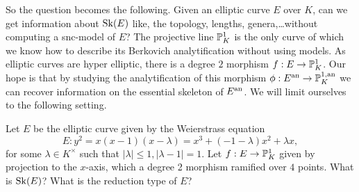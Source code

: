 So the question becomes the following. Given an elliptic curve $E$ over $K$, can we get information about $\operatorname{Sk}(E)$ like, the topology, lengths, genera,\ldots without computing a snc-model of  $E$?
The projective line $\mathbb{P}^{1}_K$ is the only curve of which we know how to describe its Berkovich analytification without using models. 
As elliptic curves are hyper elliptic, there is a degree $2$ morphism $f: E \to \mathbb{P}^{1}_K$. 
Our hope is that by studying the analytification of this morphism $\phi: E\an \to \pro^{1, \text{an}}_K$ we can recover information on the essential skeleton of $E{}^{\text{an}}$. 
We will limit ourselves to the following setting.
\begin{problem}\label{prob:main_problem}
	Let $E$ be the elliptic curve given by the Weierstrass equation 
	\begin{equation}\label{eq:weierstrass_problem}
		E: y^2 = x(x-1)(x-\lambda) = x^3 + (-1 - \lambda) x^2 + \lambda x
	,\end{equation}
	for some $\lambda \in K^\times $ such that $|\lambda| \le 1, |\lambda - 1| = 1$. 
	Let $f: E \to \mathbb{P}^{1}_K$ given by projection to the $x$-axis, which a degree 2 morphism ramified over $4$ points. 
	What is $\operatorname{Sk} (E)$? What is the reduction type of $E$?
\end{problem}
\setlength{\LTcapwidth}{5.7in}

